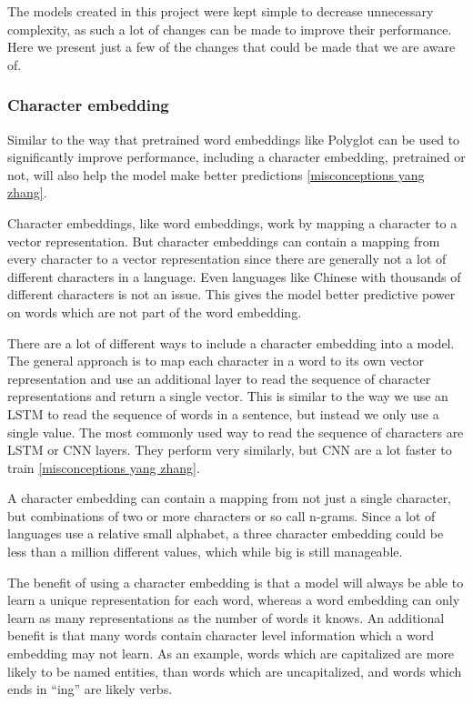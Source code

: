 The models created in this project were kept simple to decrease unnecessary
complexity, as such a lot of changes can be made to improve their performance.
Here we present just a few of the changes that could be made that we are aware
of.

\subsubsection{Character embedding}

Similar to the way that pretrained word embeddings like Polyglot can be used to
significantly improve performance, including a character embedding, pretrained
or not, will also help the model make better predictions \ref{misconceptions
yang zhang}.

Character embeddings, like word embeddings, work by mapping a character to a
vector representation. But character embeddings can contain a mapping from every
character to a vector representation since there are generally not a lot of
different characters in a language. Even languages like Chinese with thousands
of different characters is not an issue. This gives the model better predictive
power on words which are not part of the word embedding.

There are a lot of different ways to include a character embedding into a model.
The general approach is to map each character in a word to its own vector
representation and use an additional layer to read the sequence of character
representations and return a single vector. This is similar to the way we use an
LSTM to read the sequence of words in a sentence, but instead we only use a
single value. The most commonly used way to read the sequence of characters are
LSTM or CNN layers. They perform very similarly, but CNN are a lot faster to
train \ref{misconceptions yang zhang}.

A character embedding can contain a mapping from not just a single character,
but combinations of two or more characters or so call n-grams. Since a lot of
languages use a relative small alphabet, a three character embedding could be
less than a million different values, which while big is still manageable.

The benefit of using a character embedding is that a model will always be able
to learn a unique representation for each word, whereas a word embedding can
only learn as many representations as the number of words it knows. An
additional benefit is that many words contain character level information which
a word embedding may not learn. As an example, words which are capitalized are
more likely to be named entities, than words which are uncapitalized, and words
which ends in ``ing'' are likely verbs.


